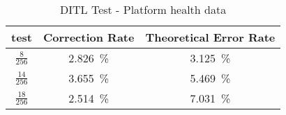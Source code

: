 \begin{table}[h]
\begin{center}
\begin{tabular}{c||c c}

test & Correction Rate & Theoretical Error Rate \\ \hline
$\frac{8}{256}$  & \SI{2.826}{\percent} & \SI{3.125}{\percent} \\ [0.2em]
$\frac{14}{256}$ & \SI{3.655}{\percent} & \SI{5.469}{\percent} \\ [0.2em]
$\frac{18}{256}$ & \SI{2.514}{\percent} & \SI{7.031}{\percent} \\ [0.2em]

\end{tabular}
\end{center}
\caption {DITL Test - Platform health data}
\label{tab:stress-fec}
\end{table}

